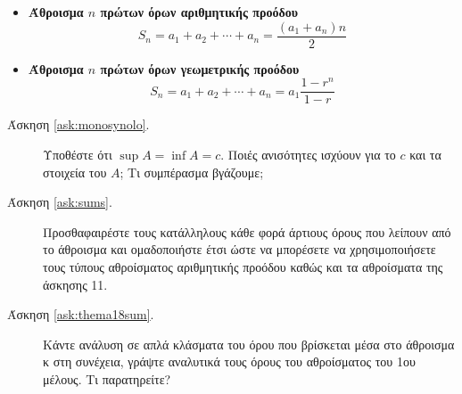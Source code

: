 \vspace{\baselineskip}


\begin{center}
\end{center}

\begin{itemize}
    \item {\bfseries Άθροισμα $n$ πρώτων όρων αριθμητικής προόδου}
        \[
            S_{n} = a_{1} + a_{2} + \cdots + a_{n} = \frac{(a_{1} + a_{n})n}{2} 
         \]
     \item {\bfseries Άθροισμα $n$ πρώτων όρων γεωμετρικής προόδου}
         \[
             S_{n} = a_{1} + a_{2} + \cdots + a_{n} = a_{1}\frac{1 - r^{n}}{1-r}  
          \] 
\end{itemize}

\begin{description}

    \item [Άσκηση \ref{ask:monosynolo}.] Υποθέστε ότι $ \sup A = \inf A = c
    $. Ποιές ανισότητες ισχύουν για το $c$ και τα στοιχεία του $A$; 
    Τι συμπέρασμα βγάζουμε;


    \item [Άσκηση \ref{ask:sums}.] Προσθαφαιρέστε τους κατάλληλους κάθε φορά  άρτιους όρους
        που λείπουν από το άθροισμα και ομαδοποιήστε έτσι ώστε να μπορέσετε να 
        χρησιμοποιήσετε τους τύπους αθροίσματος αριθμητικής προόδου καθώς και τα 
        αθροίσματα της άσκησης 11.

    \item [Άσκηση \ref{ask:thema18sum}.] Κάντε ανάλυση σε απλά κλάσματα 
        του όρου που βρίσκεται μέσα στο άθροισμα κ στη συνέχεια, γράψτε
        αναλυτικά τους όρους του αθροίσματος του 1ου μέλους. Τι παρατηρείτε?

\end{description}




